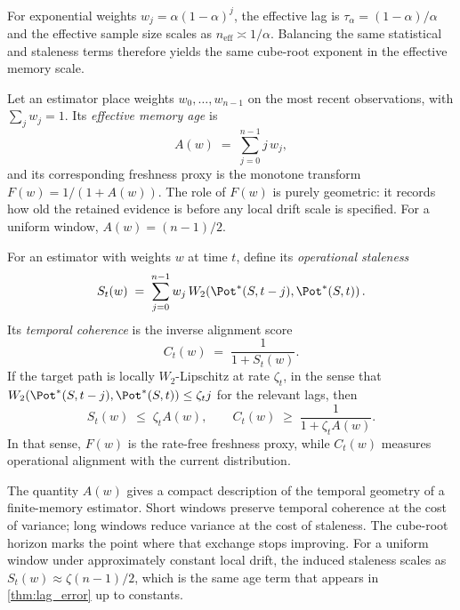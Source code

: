 \begin{corollary}\label{cor:ewma_cube_root}
For exponential weights $w_j = \alpha(1-\alpha)^j$, the effective lag is
$\tau_\alpha = (1-\alpha)/\alpha$ and the effective sample size scales as
$n_{\mathrm{eff}} \asymp 1/\alpha$. Balancing the same statistical and
staleness terms therefore yields the same cube-root exponent in the effective
memory scale.
\end{corollary}

\begin{definition}\label{def:memory_age}
Let an estimator place weights $w_0,\dots,w_{n-1}$ on the most recent
observations, with $\sum_j w_j = 1$. Its \emph{effective memory age} is
\[
  A(w) \;=\; \sum_{j=0}^{n-1} j\,w_j,
\]
and its corresponding freshness proxy is the monotone transform
$F(w) = 1/(1+A(w))$. The role of $F(w)$ is purely geometric: it records how old
the retained evidence is before any local drift scale is specified. For a
uniform window, $A(w)=(n-1)/2$.
\end{definition}

\begin{definition}\label{def:temporal_coherence}
For an estimator with weights $w$ at time $t$, define its \emph{operational
staleness}
\[
  S_t(w) \;=\; \sum_{j=0}^{n-1} w_j\,
  W_2\!\left(\Pot^*(S,t-j),\Pot^*(S,t)\right).
\]
Its \emph{temporal coherence} is the inverse alignment score
\[
  C_t(w) \;=\; \frac{1}{1 + S_t(w)}.
\]
If the target path is locally $W_2$-Lipschitz at rate $\zeta_t$, in the sense
that $W_2\!\left(\Pot^*(S,t-j),\Pot^*(S,t)\right) \leq \zeta_t j$ for the
relevant lags, then
\[
  S_t(w) \;\leq\; \zeta_t A(w),
  \qquad
  C_t(w) \;\geq\; \frac{1}{1+\zeta_t A(w)}.
\]
In that sense, $F(w)$ is the rate-free freshness proxy, while $C_t(w)$ measures
operational alignment with the current distribution.
\end{definition}

The quantity $A(w)$ gives a compact description of the temporal geometry of a
finite-memory estimator. Short windows preserve temporal coherence at the cost
of variance; long windows reduce variance at the cost of staleness. The
cube-root horizon marks the point where that exchange stops improving. For a
uniform window under
approximately constant local drift, the induced staleness scales as
$S_t(w)\approx \zeta(n-1)/2$, which is the same age term that appears in
\cref{thm:lag_error} up to constants.

